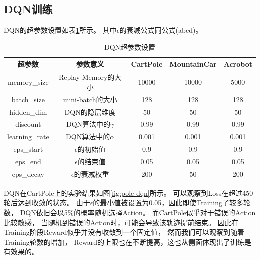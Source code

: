 \documentclass[a4paper,UTF8]{article}
\theoremstyle{definition}
\begin{document}
\subsection*{DQN训练}

DQN的超参数设置如表\ref{tab:arg-dqn}所示。
其中$\epsilon$的衰减公式同公式(abcd)。

\begin{table}[H]
	\centering
	\caption{DQN超参数设置}\label{tab:arg-dqn}
	\begin{tabular}{ccccc}
		\toprule
		超参数 & 参数意义 & CartPole & MountainCar & Acrobot \\
		\midrule
		memory\_size & Replay Memory的大小 & 10000 & 10000 & 5000 \\
		batch\_size & mini-batch的大小 & 128 & 128 & 128 \\
		hidden\_dim & DQN的隐层维度 & 50 & 50 & 50\\
		discount & DQN算法中的$\gamma$ & 0.99 & 0.99 & 0.99 \\
		learning\_rate & DQN算法中的$\alpha$ & 0.001 & 0.001 & 0.001 \\
		eps\_start & $\epsilon$的初始值 & 0.9 & 0.9 & 0.9 \\
		eps\_end & $\epsilon$的结束值 & 0.05 & 0.05 & 0.05\\
		eps\_decay & $\epsilon$的衰减权重 & 200 & 50 & 200 \\
		\bottomrule
	\end{tabular}
\end{table}

DQN在CartPole上的实验结果如图\ref{fig:pole-dqn}所示。
可以观察到Loss在超过450轮后达到收敛的状态。
由于$\epsilon$的最小值被设置为0.05，因此即使Training了较多轮数，
DQN依旧会以5\%的概率随机选择Action。
而CartPole似乎对于错误的Action比较敏感，
当随机到错误的Action时，可能会导致该轨迹提前结束。
因此在Training阶段Reward似乎并没有收敛到一个固定值，
然而我们可以观察到随着Training轮数的增加，
Reward的上限也在不断提高，这也从侧面体现出了训练是有效果的。
\end{document}
